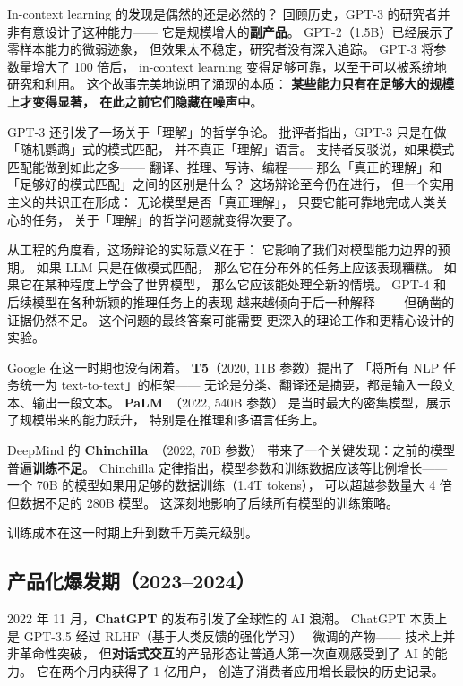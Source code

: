 In-context learning 的发现是偶然的还是必然的？
回顾历史，GPT-3 的研究者并非有意设计了这种能力——
它是规模增大的\textbf{副产品}。
GPT-2（1.5B）已经展示了零样本能力的微弱迹象，
但效果太不稳定，研究者没有深入追踪。
GPT-3 将参数量增大了 100 倍后，
in-context learning 变得足够可靠，以至于可以被系统地研究和利用。
这个故事完美地说明了涌现的本质：
\textbf{某些能力只有在足够大的规模上才变得显著，
在此之前它们隐藏在噪声中}。

GPT-3 还引发了一场关于「理解」的哲学争论。
批评者指出，GPT-3 只是在做「随机鹦鹉」式的模式匹配，
并不真正「理解」语言。
支持者反驳说，如果模式匹配能做到如此之多——
翻译、推理、写诗、编程——
那么「真正的理解」和「足够好的模式匹配」之间的区别是什么？
这场辩论至今仍在进行，
但一个实用主义的共识正在形成：
无论模型是否「真正理解」，
只要它能可靠地完成人类关心的任务，
关于「理解」的哲学问题就变得次要了。

从工程的角度看，这场辩论的实际意义在于：
它影响了我们对模型能力边界的预期。
如果 LLM 只是在做模式匹配，
那么它在分布外的任务上应该表现糟糕。
如果它在某种程度上学会了世界模型，
那么它应该能处理全新的情境。
GPT-4 和后续模型在各种新颖的推理任务上的表现
越来越倾向于后一种解释——
但确凿的证据仍然不足。
这个问题的最终答案可能需要
更深入的理论工作和更精心设计的实验。

Google 在这一时期也没有闲着。
\textbf{T5}（2020, 11B 参数）提出了
「将所有 NLP 任务统一为 text-to-text」的框架——
无论是分类、翻译还是摘要，都是输入一段文本、输出一段文本。
\textbf{PaLM}~\cite{chowdhery2022palm}（2022, 540B 参数）
是当时最大的密集模型，展示了规模带来的能力跃升，
特别是在推理和多语言任务上。

DeepMind 的 \textbf{Chinchilla}~\cite{hoffmann2022chinchilla}（2022, 70B 参数）
带来了一个关键发现：之前的模型普遍\textbf{训练不足}。
Chinchilla 定律指出，模型参数和训练数据应该等比例增长——
一个 70B 的模型如果用足够的数据训练（1.4T tokens），
可以超越参数量大 4 倍但数据不足的 280B 模型。
这深刻地影响了后续所有模型的训练策略。

训练成本在这一时期上升到数千万美元级别。

\subsection{产品化爆发期（2023--2024）}

2022 年 11 月，\textbf{ChatGPT} 的发布引发了全球性的 AI 浪潮。
ChatGPT 本质上是 GPT-3.5 经过 RLHF（基于人类反馈的强化学习）
~\cite{ouyang2022rlhf}微调的产物——
技术上并非革命性突破，
但\textbf{对话式交互}的产品形态让普通人第一次直观感受到了 AI 的能力。
它在两个月内获得了 1 亿用户，
创造了消费者应用增长最快的历史记录。

